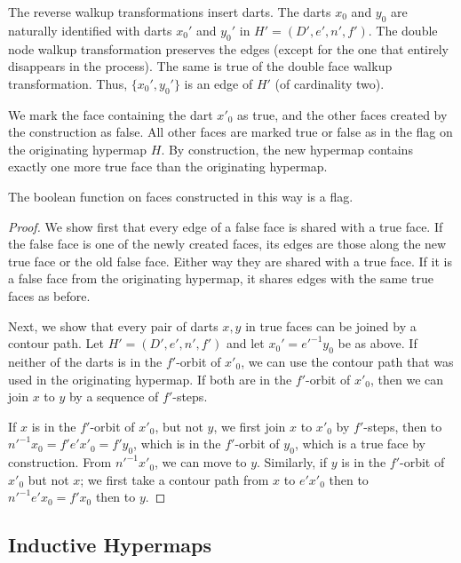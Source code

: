 The reverse walkup transformations insert darts.  The darts $x_0$ and
$y_0$ are naturally identified with darts $x_0'$ and $y_0'$ in $H'=(D',e',n',f')$.
The double node walkup transformation preserves the edges (except for
the one that entirely disappears in the process).  The same is true of the
double face walkup transformation.  Thus, $\{x_0',y_0'\}$ is an edge of
$H'$ (of cardinality two).

We mark the face containing the dart $x'_0$ as true, and the other
faces created by the construction as false.   All other faces are
marked true or false as in the flag on the originating hypermap $H$.  By
construction, the new hypermap contains exactly one more true face
than the originating hypermap.

\begin{lemma}\label{lemma:flag} 
The boolean function on faces constructed in this way is a
flag.
\end{lemma}

\begin{proof}  We show first that every edge of a false face is shared
with a true face.  If the false face is one of the newly created
faces, its edges are those along the new true face or the old false
face. Either way they are shared with a true face.   If it is a
false face from the originating hypermap, it shares edges with the
same true faces as before.

Next, we show that every pair of darts $x,y$ in true faces can be
joined by a contour path.  Let $H'=(D',e',n',f')$ and let
$x_0' = e'^{-1} y_0$ be as above.  If neither of the darts is in the
$f'$-orbit of $x'_0$, we can use the contour path that was used in the
originating hypermap.  If both are in the $f'$-orbit of $x'_0$, then
we can join $x$ to $y$ by a sequence of $f'$-steps.

If $x$ is in the $f'$-orbit of $x'_0$, but not $y$, we first join $x$
to $x'_0$ by $f'$-steps, then to $n'^{-1} x_0 = f' e' x'_0 = f' y_0$, 
which is in
the $f'$-orbit of $y_0$, which is a true face by construction.
From $n'^{-1} x'_0$, we can move to $y$.
Similarly, if $y$ is in the $f'$-orbit of $x'_0$ but not $x$; we first
take a contour path from $x$ to $e' x'_0$ then to $n'^{-1} e' x_0 = f'
x_0$ then to $y$.
\end{proof}

\subsection{Inductive Hypermaps}

